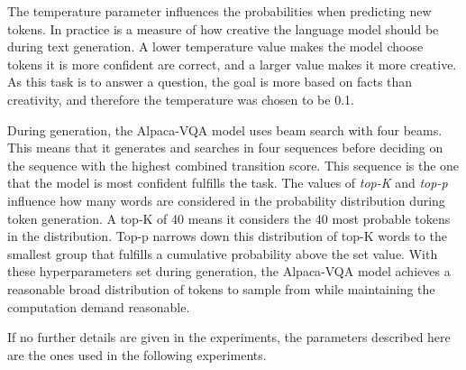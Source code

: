     The temperature parameter influences the probabilities when predicting new tokens. In practice is a measure of how creative the language model should be during text generation. A lower temperature value makes the model choose tokens it is more confident are correct, and a larger value makes it more creative. As this task is to answer a question, the goal is more based on facts than creativity, and therefore the temperature was chosen to be 0.1.

    During generation, the Alpaca-VQA model uses beam search with four beams. This means that it generates and searches in four sequences before deciding on the sequence with the highest combined transition score. This sequence is the one that the model is most confident fulfills the task.
    The values of \textit{top-K} and \textit{top-p} influence how many words are considered in the probability distribution during token generation. A top-K of 40 means it considers the 40 most probable tokens in the distribution. Top-p narrows down this distribution of top-K words to the smallest group that fulfills a cumulative probability above the set value. 
    With these hyperparameters set during generation, the Alpaca-VQA model achieves a reasonable broad distribution of tokens to sample from while maintaining the computation demand reasonable. 
    
    If no further details are given in the experiments, the parameters described here are the ones used in the following experiments.

